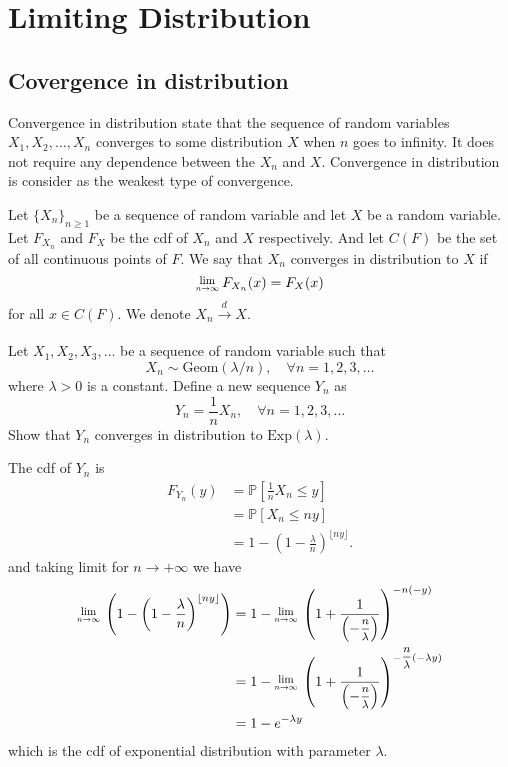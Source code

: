\chapter{Limiting Distribution}

\section{Covergence in distribution}

Convergence in distribution state that 
the sequence of random variables $X_1, X_2, \ldots, X_n$ 
converges to some distribution $X$ when $n$ goes to infinity.
It does not require any dependence between the $X_n$ and $X$. Convergence in distribution is 
consider as the weakest type of convergence.

\begin{definition}
    Let $\{X_n\}_{n \geq 1}$ be a sequence of random variable and let $X$ be a random variable. Let $F_{X_n}$ and 
    $F_X$ be the cdf of $X_n$ and $X$ respectively. And let $C(F)$ be the set of all continuous points of
    $F$. We say that $X_n$ converges in distribution to $X$ if 
    \begin{equation}
        \Lim{n \to \infty} F_{X_n}(x) = F_X(x)
    \end{equation}
    for all $x \in C(F)$. We denote $X_n \xrightarrow[]{d} X$. 
\end{definition}

\begin{example}
    Let $X_1, X_2, X_3, \ldots$ be a sequence of random variable such that 
    \[
        X_n \sim \text{Geom}(\lambda /n), \quad \forall n = 1,2,3,\ldots
    \]
    where $\lambda > 0$ is a constant. Define a new sequence $Y_n$ as 
    \[
        Y_n = \frac{1}{n}X_n, \quad \forall n = 1,2,3,\ldots
    \]
    Show that $Y_n$ converges in distribution to $\text{Exp}(\lambda)$.
\end{example}

\begin{solution}
    The cdf of $Y_n$ is 
    \begin{align*}
        F_{Y_n}(y) &= \mathbb{P}\left[ \frac{1}{n}X_n \leq y \right]\\
        &= \mathbb{P}\left[ X_n \leq ny \right]\\
        &= 1 - \left( 1- \frac{\lambda}{n} \right)^{\lfloor ny \rfloor }.
    \end{align*}
    and taking limit for $n \to +\infty$ we have 
    \begin{align*}
        \Lim{n \to \infty} \left( 1 - \left( 1- \frac{\lambda}{n} \right)^{\lfloor ny \rfloor } \right) 
        &= 1 - \Lim{n \to \infty} \left( 1 + \frac{1}{\left(-\mfrac{n}{\lambda} \right)} \right)^{-n(-y)}\\
        &= 1 - \Lim{n \to \infty} \left( 1 + \frac{1}{\left(-\mfrac{n}{\lambda}\right)} \right)^{-\mfrac{n}{\lambda}(-\lambda y)}\\
        &= 1 - e^{-\lambda y}
    \end{align*}
    which is the cdf of exponential distribution with parameter $\lambda$.
\end{solution}

